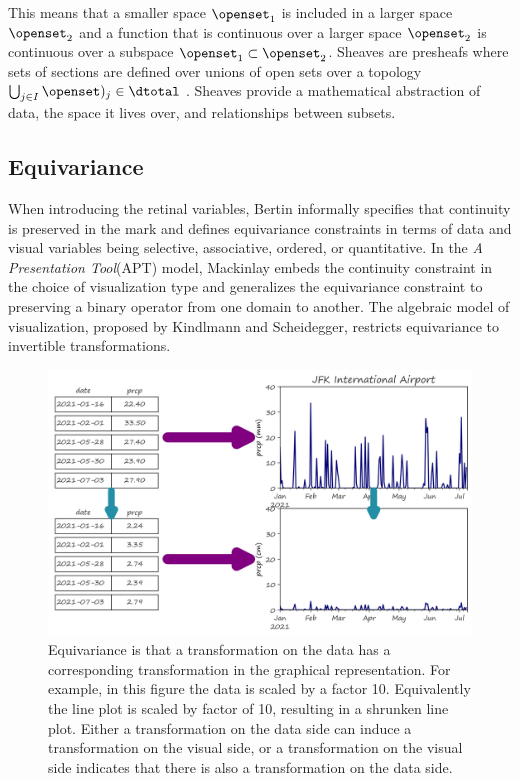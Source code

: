 \documentclass[10pt,journal,compsoc]{IEEEtran}
\theoremstyle{definition}
\theoremstyle{remark}
\begin{document}
This means that a smaller space $\openset_1$ is included in a larger space $\openset_2$ and a function that is continuous over a larger space $\openset_2$ is continuous over a subspace $\openset_1 \subset\openset_2$. Sheaves are presheafs where sets of sections are defined over unions of open sets over a topology $\bigcup_{j \in I} \openset)_j \in \dtotal$ \cite{spanier1989algebraic, nlab:sheaf}. Sheaves provide a mathematical abstraction of data, the space it lives over, and relationships between subsets. 

\subsection{Equivariance}
\label{sec:related-work:equivariance}
When introducing the retinal variables, Bertin informally specifies that continuity is preserved in the mark and defines equivariance constraints in terms of data and visual variables being selective, associative, ordered, or quantitative\cite{bertinSemiologyGraphicsDiagrams2011a}. In the \textit{A Presentation Tool}(APT) model, Mackinlay embeds the continuity constraint in the choice of visualization type and generalizes the equivariance constraint to preserving a binary operator from one domain to another. The algebraic model of visualization\cite{kindlmannAlgebraicProcessVisualization2014}, proposed by Kindlmann and Scheidegger, restricts equivariance to invertible transformations.

\begin{figure}[!h]
  \label{fig:related-work:equivariance}
  \includegraphics[width=\columnwidth]{equiv.png}
  \caption{Equivariance is that a transformation on the data has a corresponding transformation in the graphical representation. For example, in this figure the data is scaled by a factor 10. Equivalently the line plot is scaled by factor of 10, resulting in a shrunken line plot. Either a transformation on the data side can induce a transformation on the visual side, or a transformation on the visual side indicates that there is also a transformation on the data side. }
\end{figure}
\end{document}
